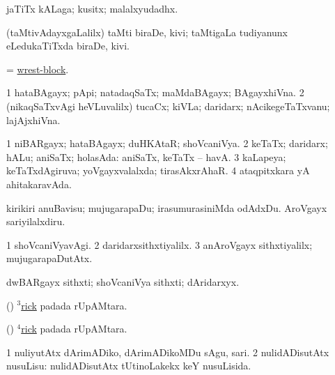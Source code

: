 \begin{center}
\bentry
{} 
\gl{\nA}
\expl{}
\bmng
jaTiTx kALaga; kusitx; malalxyudadhx. 
\emng
\eentry

\bentry
{} 
\gl{\nA}
\expl{}
\bmng
(taMtivAdayxgaLalilx) taMti biraDe, kivi; taMtigaLa tudiyanunx eLedukaTiTxda biraDe, kivi. 
\emng
\eentry

\bentry
{} 
\gl{\nA}
\expl{}
\bmng
= \hyperlink{wrest-block}{wrest-block}. 
\emng
\eentry

\bentry
{} 
\gl{\nA}
\expl{}
\bmng
\bnum
\num{1} hataBAgayx; pApi; natadaqSaTx; maMdaBAgayx; BAgayxhiVna. 
\num{2} (nikaqSaTxvAgi heVLuvalilx) tucaCx; kiVLa; daridarx; nAcikegeTaTxvanu; lajAjxhiVna. 
\enum
\emng
\eentry

\bentry
{} 
\gl{\gu}
\bmng
\bnum
\num{1} niBARgayx; hataBAgayx; duHKAtaR; shoVcaniVya. 
\num{2} keTaTx; daridarx; hALu; aniSaTx; holasAda:  aniSaTx, keTaTx -- havA. 
\num{3} kaLapeya; keTaTxdAgiruva; yoVgayxvalalxda; tirasAkxrAhaR. 
\num{4} ataqpitxkara yA ahitakaravAda. 
\enum
\emng

\noindent
\gl{\pagu}
\expl{}
\bmng
{} 
\banum
{} kirikiri anuBavisu; mujugarapaDu; irasumurasiniMda odAdxDu. 
 AroVgayx sariyilalxdiru. 
\eanum
\emng
\eentry

\bentry
{} 
\gl{\kirxvi}
\expl{}
\bmng
\bnum
\num{1} shoVcaniVyavAgi. 
\num{2} daridarxsithxtiyalilx. 
\num{3} anAroVgayx sithxtiyalilx; mujugarapaDutAtx. 
\enum
\emng
\eentry

\bentry
{} 
\gl{\nA}
\expl{}
\bmng
dwBARgayx sithxti; shoVcaniVya sithxti; dAridarxyx. 
\emng
\eentry

\bentry
{} 
\gl{\nA}
\bmng
(\birx) \hyperref{kandict_r.pdf}{R}{rick(3)}{$^3$rick} padada rUpAMtara. 
\emng
\eentry

\bentry
{} 
\gl{\sakirx}
\expl{}
\bmng
(\birx) \hyperref{kandict_r.pdf}{R}{rick(4)}{$^4$rick} padada rUpAMtara. 
\emng
\eentry

\bentry
{} 
\gl{\sakirx}
\expl{}
\bmng
\bnum
\num{1} nuliyutAtx dArimADiko, dArimADikoMDu sAgu, sari. 
\num{2} nulidADisutAtx nusuLisu:  nulidADisutAtx tUtinoLakekx keY nusuLisida. 
\enum
\emng


\end{center}
